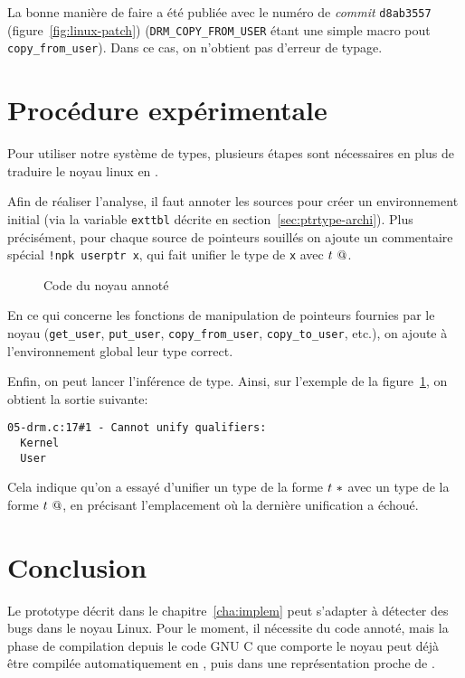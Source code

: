 La bonne manière de faire a été publiée avec le numéro de \emph{commit}
\texttt{d8ab3557} (figure~\ref{fig:linux-patch}) (\texttt{DRM\_COPY\_FROM\_USER}
étant une simple macro pout \texttt{copy\_from\_user}). Dans ce cas, on
n'obtient pas d'erreur de typage.

\section{Procédure expérimentale}
\label{sec:demo-unif}

Pour utiliser notre système de types, plusieurs étapes sont nécessaires en plus
de traduire le noyau linux en \langname{}.

Afin de réaliser l'analyse, il faut annoter les sources pour créer un
environnement initial (via la variable \texttt{exttbl} décrite en
section~\ref{sec:ptrtype-archi}). Plus précisément, pour chaque source de
pointeurs souillés on ajoute un commentaire spécial \texttt{!npk userptr x},
qui fait unifier le type de \texttt{x} avec $t~@$.

\begin{figure}

\caption{Code du noyau annoté}
\label{fig:ex-drm}
\end{figure}

En ce qui concerne les fonctions de manipulation de pointeurs fournies
par le noyau (\texttt{get\_user}, \texttt{put\_user},
\texttt{copy\_from\_user}, \texttt{copy\_to\_user}, etc.), on ajoute à
l'environnement global leur type correct.

Enfin, on peut lancer l'inférence de type. Ainsi, sur l'exemple de la
figure~\ref{fig:ex-drm}, on obtient la sortie suivante:

\begin{Verbatim}
05-drm.c:17#1 - Cannot unify qualifiers:
  Kernel
  User
\end{Verbatim}

Cela indique qu'on a essayé d'unifier un type de la forme $t~*$ avec un
type de la forme $t~@$, en précisant l'emplacement où la dernière
unification a échoué.

\section*{Conclusion}

Le prototype décrit dans le chapitre~\ref{cha:implem} peut s'adapter à détecter
des bugs dans le noyau Linux. Pour le moment, il nécessite du code annoté, mais
la phase de compilation depuis le code GNU C que comporte le noyau peut déjà
être compilée automatiquement en \newspeak, puis dans une représentation proche
de \langname.

